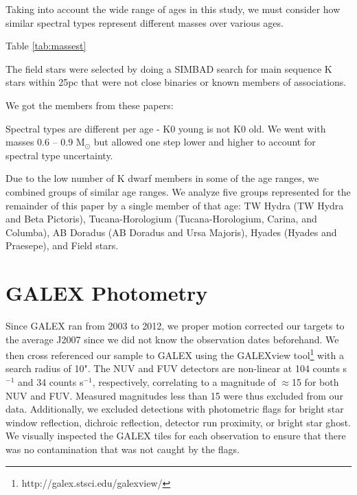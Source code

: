 \documentclass[twocolumn]{aastex62}
\begin{document}
Taking into account the wide range of ages in this study, we must consider how similar spectral types represent different masses over various ages. 

Table \ref{tab:massest}


The field stars were selected by doing a SIMBAD search for main sequence K stars within 25pc that were not close binaries or known members of associations. 




We got the members from these papers:

Spectral types are different per age - K0 young is not K0 old. We went with masses 0.6 -- 0.9 M$_{\odot}$ but allowed one step lower and higher to account for spectral type uncertainty.


Due to the low number of K dwarf members in some of the age ranges, we combined groups of similar age ranges. We analyze five groups represented for the remainder of this paper by a single member of that age: TW Hydra (TW Hydra and Beta Pictoris), Tucana-Horologium (Tucana-Horologium, Carina, and Columba), AB Doradus (AB Doradus and Ursa Majoris), Hyades (Hyades and Praesepe), and Field stars. 


\section{GALEX Photometry}\label{sec:photometry}




Since GALEX ran from 2003 to 2012, we proper motion corrected our targets to the average J2007 since we did not know the observation dates beforehand. We then cross referenced our sample to GALEX using the GALEXview tool\footnote{http://galex.stsci.edu/galexview/} with a search radius of 10". The NUV and FUV detectors are non-linear at 104 counts s$^{-1}$ and 34 counts s$^{-1}$, respectively, correlating to a magnitude of $\approx$15 for both NUV and FUV. Measured magnitudes less than 15 were thus excluded from our data. Additionally, we excluded detections with photometric flags for bright star window reflection, dichroic reflection, detector run proximity, or bright star ghost. We visually inspected the GALEX tiles for each observation to ensure that there was no contamination that was not caught by the flags. 
\end{document}
